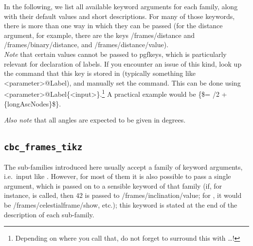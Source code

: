 \documentclass[
    DIV=11,
    BCOR=0mm,
    paper=a4,
    fontsize=11pt,
    twoside=false,
    titlepage=true
]{scrartcl}
\newcommand{\code}[1]{{\color{codecolor}\ttfamily#1}}  %
\begin{document}
In the following, we list all available keyword arguments for each family, along with their default values and short descriptions. For many of those keywords, there is more than one way in which they can be passed (for the \code{distance} argument, for example, there are the keys \code{/frames/distance} and \code{/frames/binary/distance}, and \code{/frames/distance/value}).\\


\emph{Note} that certain values cannot be passed to \code{pgfkeys}, which is particularly relevant for declaration of labels. If you encounter an issue of this kind, look up the command that this key is stored in (typically something like \code{\string\cbcframes@<parameter>@Label}), and manually set the command. This can be done using \code{\string\def\string\cbcframes@<parameter>@Label\{<input>\}}.\footnote{Depending on where you call that, do not forget to surround this with \code{\string\makeatletter \dots \string\makeatother}!} A practical example would be \code{\string\def\string\cbcframes@Omega@Label\{\$\string\Omega = \string\pi/2 + \string\mathrm\{longAscNodes\}\$\}}.


\emph{Also note} that all angles are expected to be given in degrees.



        \subsection{\texttt{cbc\_frames\_tikz}}\label{sec:cbc_frames_tikz}
The sub-families introduced here usually accept a family of keyword arguments, i.e.~input like \code{\string\drawframes[sourceframe={mass1=20,mass2=10}]}. However, for most of them it is also possible to pass a single argument, which is passed on to a sensible keyword of that family (if, for instance, \code{\string\drawframes[inclination=42]} is called, then $42$ is passed to \code{/frames/inclination/value}; for \code{\string\drawframes[celestialframe=false]}, it would be \code{/frames/celestialframe/show}, etc.); this keyword is stated at the end of the description of each sub-family.
\end{document}
